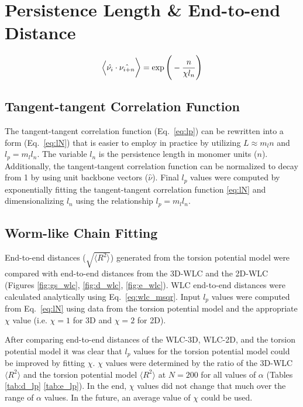 \clearpage

\section{Persistence Length \& End-to-end Distance}
\label{sec:lp}
\begin{equation}
\Big \langle \large \hat{\nu_i} \cdot \hat{\nu_{i+n}} \Big \rangle = \exp{\bigg(-\frac{n}{\chi l_{n}}\bigg)}
\label{eq:lN}
\end{equation}

\subsection{Tangent-tangent Correlation Function}

The tangent-tangent correlation function (Eq.~\ref{eq:lp}) can be rewritten into a form (Eq.~\ref{eq:lN}) that is easier to employ in practice by utilizing $L \approx m_ln$ and $l_p = m_ll_n$. The variable $l_n$ is the persistence length in monomer units ($n$). Additionally, the tangent-tangent correlation function can be normalized to decay from 1 by using unit backbone vectors ($\hat{\nu}$). Final $l_p$ values were computed by exponentially fitting the tangent-tangent correlation function \ref{eq:lN} and dimensionalizing $l_n$ using the relationship $l_p = m_ll_n$.

\subsection{Worm-like Chain Fitting}

End-to-end distances ($\sqrt{\big \langle R^2 \big \rangle}$) generated from the torsion potential model were compared with end-to-end distances from the 3D-WLC and the 2D-WLC (Figures \ref{fig:gs_wlc}, \ref{fig:d_wlc}, \ref{fig:e_wlc}). WLC end-to-end distances were calculated analytically using Eq.~\ref{eq:wlc_msqr}. Input $l_p$ values were computed from Eq.~\ref{eq:lN} using data from the torsion potential model and the appropriate $\chi$ value (i.e. $\chi = 1$ for 3D and $\chi = 2$ for 2D).

After comparing end-to-end distances of the WLC-3D, WLC-2D, and the torsion potential model it was clear that $l_p$ values for the torsion potential model could be improved by fitting $\chi$. $\chi$ values were determined by the ratio of the 3D-WLC $\big \langle R^2 \big \rangle$ and the torsion potential model $\big \langle R^2 \big \rangle$ at $N = 200$ for all values of $\alpha$ (Tables \ref{tab:d_lp} \ref{tab:e_lp}). In the end, $\chi$ values did not change that much over the range of $\alpha$ values. In the future, an average value of $\chi$ could be used.

